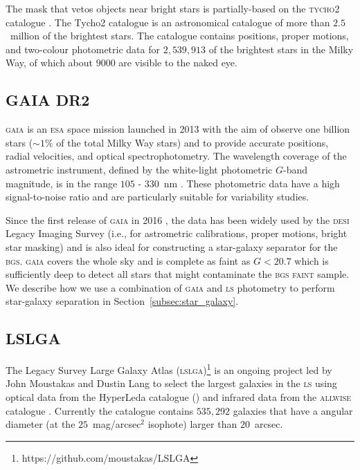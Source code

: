 \documentclass[fleqn,usenatbib]{mnras}
\newcommand{\ALLWISE}{\textsc{allwise}\xspace}
\newcommand{\BGSF}{\textsc{bgs faint}\xspace}
\newcommand{\BGS}{\textsc{bgs}\xspace}
\newcommand{\DESI}{\textsc{desi}\xspace}
\newcommand{\ESA}{\textsc{esa}\xspace}
\newcommand{\GAIA}{\textsc{gaia}\xspace}
\newcommand{\LS}{\textsc{ls}\xspace}
\newcommand{\LSLGA}{\textsc{lslga}\xspace}
\newcommand{\Tycho}{\textsc{tycho2}\xspace}
\begin{document}
The mask that vetos objects near bright stars is partially-based on the \Tycho catalogue \citep{2000A&A...355L..27H}. The Tycho2 catalogue is an astronomical catalogue of more than $2.5$~million of the brightest stars. The catalogue contains positions, proper motions, and two-colour photometric data for $2,539,913$ of the brightest stars in the Milky Way, of which about $9000$ are visible to the naked eye.

\subsection{GAIA DR2}\label{subsec:gaia}

\GAIA \citep{2016A&A...595A...1G} is an \ESA space mission launched in 2013 with the aim of observe one billion stars ($\sim 1 \%$ of the total Milky Way stars) and to provide accurate positions, radial velocities, and optical spectrophotometry. The wavelength coverage of the astrometric instrument, defined by the white-light photometric $G$-band magnitude, is in the range $105$ - $330$~nm \citep{2016A&A...595A...7C}. These photometric data have a high signal-to-noise ratio and are particularly  suitable  for  variability  studies.

Since the first release of \GAIA in 2016 \citep{2016A&A...595A...2G}, the data
has been widely used by the \DESI Legacy Imaging Survey (i.e., for astrometric calibrations, proper motions, bright star masking) and is also ideal for constructing a star-galaxy separator for the \BGS. 
\GAIA covers the whole sky and is complete as faint as $G < 20.7$ which is sufficiently deep to detect all stars that might contaminate the \BGSF sample. We describe how we use a combination of \GAIA and \LS photometry to perform star-galaxy separation in Section~\ref{subsec:star_galaxy}.

\subsection{LSLGA}\label{subsec:LSLGA}

The Legacy Survey Large Galaxy Atlas (\LSLGA)\footnote{https://github.com/moustakas/LSLGA} is an ongoing project led by John Moustakas and Dustin Lang to select the largest galaxies in the \LS using optical data from the HyperLeda catalogue (\citet{2014A&A...570A..13M}) and infrared data from the \ALLWISE catalogue \citep{2015ApJS..221...12S}. Currently the catalogue contains $535,292$ galaxies that have a angular diameter (at the $25$~mag/arcsec$^2$ isophote) larger than $20$~arcsec.
\end{document}
